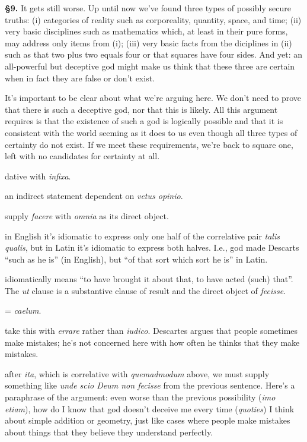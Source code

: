 \prenotes

\textbf{§9.} It gets still worse. Up until now we've found three types of possibly secure truths: (i) categories of reality such as corporeality, quantity, space, and time; (ii) very basic disciplines such as mathematics which, at least in their pure forms, may address only items from (i); (iii) very basic facts from the diciplines in (ii) such as that two plus two equals four or that squares have four sides. And yet: an all-powerful but deceptive god might make us think that these three are certain when in fact they are false or don't exist.

It's important to be clear about what we're arguing here. We don't need to prove that there is such a deceptive god, nor that this is likely. All this argument requires is that the existence of such a god is logically possible and that it is consistent with the world seeming as it does to us even though all three types of certainty do not exist. If we meet these requirements, we're back to square one, left with no candidates for certainty at all.

 dative with \textit{infixa}.

 an indirect statement dependent on \textit{vetus opinio}.

 supply \textit{facere} with \textit{omnia} as its direct object.

 in English it's idiomatic to express only one half of the correlative pair \textit{talis qualis}, but in Latin it's idiomatic to express both halves. I.e., god made Descarts ``such as he is'' (in English), but ``of that sort which sort he is'' in Latin.

 idiomatically means ``to have brought it about that, to have acted (such) that''. The \textit{ut} clause is a substantive clause of result and the direct object of \textit{fecisse}.

 = \textit{caelum}.

 take this with \textit{errare} rather than \textit{iudico}. Descartes argues that people sometimes make mistakes; he's not concerned here with how often he thinks that they make mistakes.

 after \textit{ita}, which is correlative with \textit{quemadmodum} above, we must supply something like \textit{unde scio Deum non fecisse} from the previous sentence. Here's a paraphrase of the argument: even worse than the previous possibility (\textit{imo etiam}), how do I know that god doesn't deceive me every time (\textit{quoties}) I think about simple addition or geometry, just like cases where people make mistakes about things that they believe they understand perfectly.

